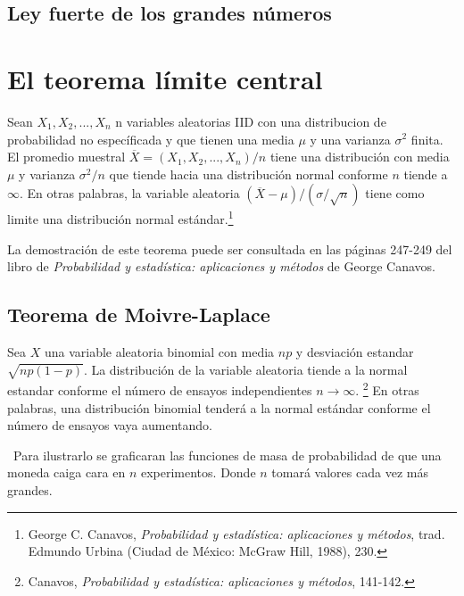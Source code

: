 \documentclass[8pt]{article}
\begin{document}
\subsection{Ley fuerte de los grandes números}




\section{El teorema límite central}

Sean $X_1, X_2, ..., X_n$ n variables aleatorias IID con una distribucion de probabilidad no específicada y que tienen una media $\mu$ y una varianza $\sigma^2$ finita. El promedio muestral $\overline{X} = (X_1, X_2, ..., X_n)/n$ tiene una distribución con media $\mu$ y varianza $\sigma^2/n$ que tiende hacia una distribución normal conforme $n$ tiende a $\infty$. En otras palabras, la variable aleatoria $(\overline{X}-\mu)/(\sigma/\sqrt{n})$ tiene como limite una distribución normal estándar.\footnote{George C. Canavos, \textit{Probabilidad y estadística: aplicaciones y métodos}, trad. Edmundo Urbina (Ciudad de México: McGraw Hill, 1988), 230.} 

La demostración de este teorema puede ser consultada en las páginas 247-249 del libro de \textit{Probabilidad y estadística: aplicaciones y métodos} de George Canavos.

\subsection{Teorema de Moivre-Laplace}

Sea $X$ una variable aleatoria binomial con media $np$ y desviación estandar $\sqrt{np(1-p)}$. La distribución de la variable aleatoria tiende a la normal estandar conforme el número de ensayos independientes $n \rightarrow \infty$. \footnote{Canavos, \textit{Probabilidad y estadística: aplicaciones y métodos}, 141-142.} En otras palabras, una distribución binomial tenderá a la normal estándar conforme el número de ensayos vaya aumentando.

\
Para ilustrarlo se graficaran las funciones de masa de probabilidad de que una moneda caiga cara en $n$ experimentos. Donde $n$ tomará valores cada vez más grandes.\
\end{document}
